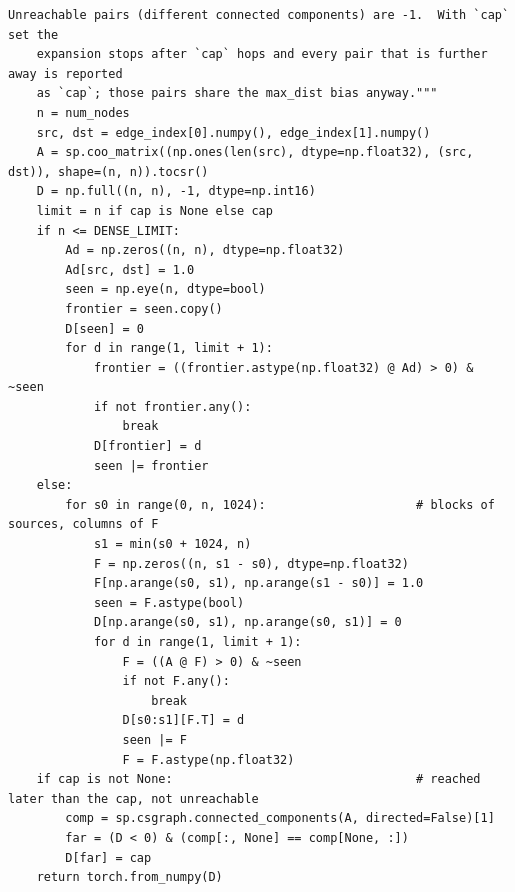 \begin{lstlisting}[style=p1py]
    Unreachable pairs (different connected components) are -1.  With `cap` set the
    expansion stops after `cap` hops and every pair that is further away is reported
    as `cap`; those pairs share the max_dist bias anyway."""
    n = num_nodes
    src, dst = edge_index[0].numpy(), edge_index[1].numpy()
    A = sp.coo_matrix((np.ones(len(src), dtype=np.float32), (src, dst)), shape=(n, n)).tocsr()
    D = np.full((n, n), -1, dtype=np.int16)
    limit = n if cap is None else cap
    if n <= DENSE_LIMIT:
        Ad = np.zeros((n, n), dtype=np.float32)
        Ad[src, dst] = 1.0
        seen = np.eye(n, dtype=bool)
        frontier = seen.copy()
        D[seen] = 0
        for d in range(1, limit + 1):
            frontier = ((frontier.astype(np.float32) @ Ad) > 0) & ~seen
            if not frontier.any():
                break
            D[frontier] = d
            seen |= frontier
    else:
        for s0 in range(0, n, 1024):                     # blocks of sources, columns of F
            s1 = min(s0 + 1024, n)
            F = np.zeros((n, s1 - s0), dtype=np.float32)
            F[np.arange(s0, s1), np.arange(s1 - s0)] = 1.0
            seen = F.astype(bool)
            D[np.arange(s0, s1), np.arange(s0, s1)] = 0
            for d in range(1, limit + 1):
                F = ((A @ F) > 0) & ~seen
                if not F.any():
                    break
                D[s0:s1][F.T] = d
                seen |= F
                F = F.astype(np.float32)
    if cap is not None:                                  # reached later than the cap, not unreachable
        comp = sp.csgraph.connected_components(A, directed=False)[1]
        far = (D < 0) & (comp[:, None] == comp[None, :])
        D[far] = cap
    return torch.from_numpy(D)
\end{lstlisting}


